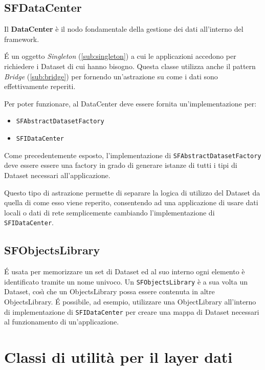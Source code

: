 \subsection{SFDataCenter}
\label{sub:sfdatacenter} 
Il \textbf{DataCenter} \`e il nodo fondamentale della gestione dei dati all'interno del framework. 

\'E un oggetto \textit{Singleton} (\ref{sub:singleton}) a cui le applicazioni accedono per richiedere i Dataset di cui hanno bisogno. Questa classe utilizza anche il pattern \textit{Bridge} (\ref{sub:bridge}) per fornendo un'astrazione su come i dati sono effettivamente reperiti.

Per poter funzionare, al DataCenter deve essere fornita un'implementazione per:
\begin{itemize}
	\item \texttt{SFAbstractDatasetFactory}
	\item \texttt{SFIDataCenter}
\end{itemize}

Come precedentemente esposto, l'implementazione di \texttt{SFAbstractDatasetFactory} deve essere essere una factory in grado di generare istanze di tutti i tipi di Dataset necessari all'applicazione.

Questo tipo di astrazione permette di separare la logica di utilizzo del Dataset da quella di come esso viene reperito, consentendo ad una applicazione di usare dati locali o dati di rete semplicemente cambiando l'implementazione di \texttt{SFIDataCenter}.

\subsection{SFObjectsLibrary}
\label{sub:sfobjectslibrary}
\'E usata per memorizzare un set di Dataset ed al suo interno ogni elemento \`e identificato tramite un nome univoco.
Un \texttt{SFObjectsLibrary} \`e a sua volta un Dataset, cos{\`\i} che un ObjectsLibrary possa essere contenuta in altre ObjectsLibrary.
\'E possibile, ad esempio, utilizzare una ObjectLibrary all'interno di implementazione di \texttt{SFIDataCenter} per creare una mappa di Dataset necessari al funzionamento di un'applicazione.

\section{Classi di utilit\`a per il layer dati}

